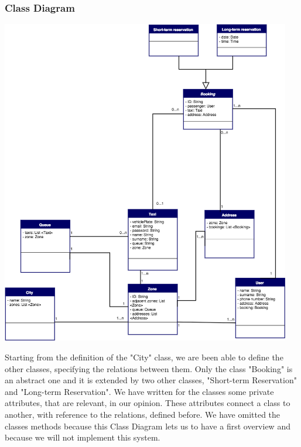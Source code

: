 \subsubsection{Class Diagram}
\begin{center}

\includegraphics[width=0.95\textwidth]{./images/ClassDiagram.png}
	\end{center}
	
Starting from the definition of the "City" class, we are been able to define the other classes, specifying the relations between them. Only the class "Booking" is an abstract one and it is extended by two other classes, "Short-term Reservation" and "Long-term Reservation".
We have written for the classes some private attributes, that are relevant, in our opinion. These attributes connect a class to another, with reference to the relations, defined before. 
We have omitted the classes methods because this Class Diagram lets us to have a first overview and because we will not implement this system.